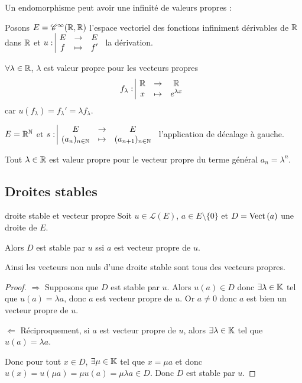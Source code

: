 Un endomorphisme peut avoir une infinité de valeurs propres :


\begin{exemple}
    Posons $E = \mathscr C^\infty(\mathbb{R}, \mathbb{R})$ l'espace vectoriel des fonctions 
    infiniment dérivables de $\mathbb{R}$ dans $\mathbb{R}$ et $u: \space \begin{array}{|ccc} \displaystyle E & \to & \displaystyle E \\ \displaystyle f & \mapsto & \displaystyle f' \end{array}$ la dérivation. 

    $\forall \lambda \in \mathbb{R}$, $\lambda$ est valeur propre pour les vecteurs propres 
    $$f_\lambda: \space \begin{array}{|ccc} \displaystyle \mathbb{R} & \to & \displaystyle \mathbb{R} \\ \displaystyle x & \mapsto & \displaystyle e^{\lambda x} \end{array}$$ car
    $u(f_\lambda) = f_\lambda' = \lambda f_\lambda$.
\end{exemple}

\begin{exemple}
    $E = \mathbb{R}^{\mathbb{N}}$ et $s: \space \begin{array}{|ccc} \displaystyle E & \to & \displaystyle E \\ \displaystyle (a_n)_{n \in \mathbb{N}} & \mapsto & \displaystyle (a_{n + 1})_{n \in \mathbb{N}} \end{array}$ l'application de décalage à gauche.

    Tout $\lambda \in \mathbb{R}$ est valeur propre pour le vecteur propre du terme général $a_n = \lambda^n$.
\end{exemple}

\subsection{Droites stables }

\begin{proposition}{droite stable et vecteur propre}{}
    Soit $u \in \mathscr L(E)$, $a \in E \setminus \{0\}$ et $D = \operatorname{Vect} \,(a)$ une droite de $E$. 

    Alors $D$ est stable par $u$ ssi $a$ est vecteur propre de $u$.

    Ainsi les vecteurs non nuls d'une droite stable sont tous des vecteurs propres. 
\end{proposition}

\begin{proof}
    $\Rightarrow$ Supposons que $D$ est stable par $u$. Alors $u(a) \in D$ donc 
    $\exists \lambda \in \mathbb{K}$ tel que $u(a) = \lambda a$, donc $a$ est vecteur propre de $u$.
    Or $a \neq 0$ donc $a$ est bien un vecteur propre de $u$.

    \lvspace $\Leftarrow$ Réciproquement, si $a$ est vecteur propre de $u$, alors 
    $\exists \lambda \in \mathbb{K}$ tel que $u(a) = \lambda a$. 

    Donc pour tout $x \in D$, $\exists \mu \in \mathbb{K}$ tel que $x = \mu a$ et donc 
    $u(x) = u(\mu a) = \mu u(a) = \mu \lambda a \in D$. Donc $D$ est stable par $u$.
\end{proof}

